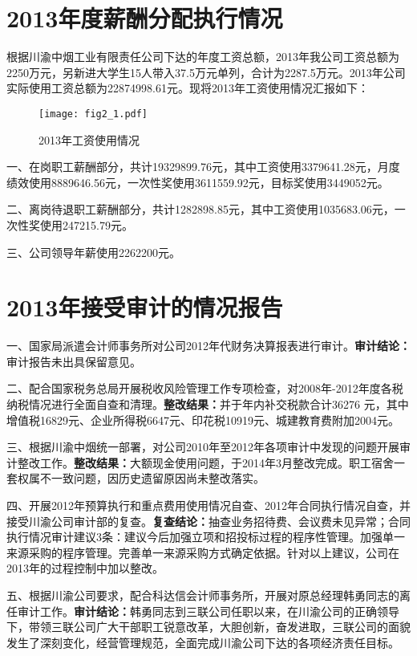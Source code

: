 


\section{2013年度薪酬分配执行情况}

\indent
根据川渝中烟工业有限责任公司下达的年度工资总额，2013年我公司工资总额为2250万元，另新进大学生15人带入37.5万元单列，合计为2287.5万元。2013年公司实际使用工资总额为22874998.61元。现将2013年工资使用情况汇报如下：

\begin{figure}[!htbp]
  \centering
  \texttt{[image: fig2\_1.pdf]}
  \caption{2013年工资使用情况}
  \label{figure2-1}
\end{figure}


一、在岗职工薪酬部分，共计19329899.76元，其中工资使用3379641.28元，月度绩效使用8889646.56元，一次性奖使用3611559.92元，目标奖使用3449052元。

二、离岗待退职工薪酬部分，共计1282898.85元，其中工资使用1035683.06元，一次性奖使用247215.79元。

三、公司领导年薪使用2262200元。







\section{2013年接受审计的情况报告}

一、国家局派遣会计师事务所对公司2012年代财务决算报表进行审计。\textbf{审计结论：}审计报告未出具保留意见。


二、配合国家税务总局开展税收风险管理工作专项检查，对2008年-2012年度各税纳税情况进行全面自查和清理。\textbf{整改结果：}并于年内补交税款合计36276 元，其中增值税16829元、企业所得税6647元、印花税10919元、城建教育费附加2004元。

三、根据川渝中烟统一部署，对公司2010年至2012年各项审计中发现的问题开展审计整改工作。\textbf{整改结果：}大额现金使用问题，于2014年3月整改完成。职工宿舍一套权属不一致问题，因历史遗留原因尚未整改落实。


四、开展2012年预算执行和重点费用使用情况自查、2012年合同执行情况自查，并接受川渝公司审计部的复查。\textbf{复查结论：}抽查业务招待费、会议费未见异常；合同执行情况审计建议3条：建议今后加强立项和招投标过程的程序性管理。加强单一来源采购的程序管理。完善单一来源采购方式确定依据。针对以上建议，公司在2013年的过程控制中加以整改。


五、根据川渝公司要求，配合科达信会计师事务所，开展对原总经理韩勇同志的离任审计工作。\textbf{审计结论：}韩勇同志到三联公司任职以来，在川渝公司的正确领导下，带领三联公司广大干部职工锐意改革，大胆创新，奋发进取，三联公司的面貌发生了深刻变化，经营管理规范，全面完成川渝公司下达的各项经济责任目标。


